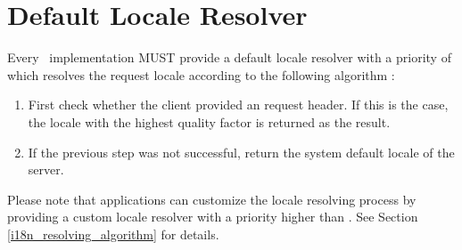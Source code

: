 \section{Default Locale Resolver}
\label{i18n_default_resolver}

Every \mvc\ implementation MUST provide a default locale resolver with a priority of 
which resolves the request locale according to the following algorithm 
:

\begin{enumerate}
\item First check whether the client provided an  request header.
 If this is the case, the locale with the highest quality factor is returned as
 the result. 
\item If the previous step was not successful, return the system default locale of the
 server.
\end{enumerate}

Please note that applications can customize the locale resolving process by providing
a custom locale resolver with a priority higher than .
See Section \ref{i18n_resolving_algorithm} for details.
